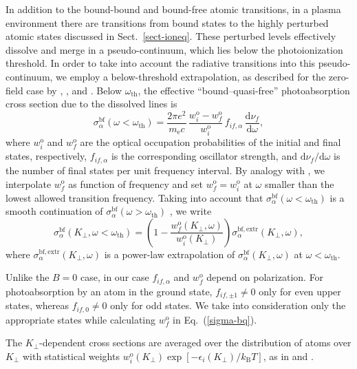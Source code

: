 \documentclass{emulateapj}
\newcommand{\beq}{\begin{equation}}
\newcommand{\eeq}{\end{equation}}
\newcommand{\req}[1]{Eq.\ (\ref{#1})}
\newcommand{\mel}{m_\mathrm{e}}
\newcommand{\dd}{\mathrm{d}}
\newcommand{\kB}{k_\mathrm{B}}
\begin{document}
In addition to the bound-bound and bound-free atomic transitions,
in a plasma environment there are transitions from bound states
to the highly perturbed atomic states 
discussed in Sect.\ \ref{sect-ioneq}.
These perturbed levels effectively dissolve and merge
in a pseudo-continuum, which lies below the photoionization threshold.
In order to take into account the radiative transitions into
this pseudo-continuum, we employ a below-threshold extrapolation, 
as described for the zero-field case
by \citet{dappen87}, \citet{Stehle}, and 
\citet{Seaton}. Below 
$\omega_\mathrm{th}$, 
the effective ``bound--quasi-free''
photoabsorption cross section
due to the dissolved lines is
\beq
   \sigma_\alpha^\mathrm{bf} (\omega < \omega_\mathrm{th})
    = \frac{2\pi e^2}{\mel c}\,
   \frac{w_i^\mathrm{o}-w_f^\mathrm{o}}{w_i^\mathrm{o}}\,
   f_{if,\alpha}\,\frac{\dd\nu_f}{\dd\omega},
\eeq
where $w_i^\mathrm{o}$ and $w_f^\mathrm{o}$ are the optical occupation 
probabilities of the initial and final states, respectively,
$f_{if,\alpha}$ is the corresponding oscillator strength,
and $\dd\nu_f/\dd\omega$ is the number of final states 
per unit frequency interval. By analogy with 
\citet{Stehle}, we interpolate $w_f^\mathrm{o}$ as function 
of frequency and set $w_f^\mathrm{o}=w_i^\mathrm{o}$
at $\omega$ smaller than the lowest allowed transition frequency.
Taking into account that $\sigma_\alpha^\mathrm{bf}(\omega<\omega_\mathrm{th})$
is a smooth continuation of $\sigma_\alpha^\mathrm{bf}(\omega>\omega_\mathrm{th})$
\citep{dappen87},
we write
\beq
    \sigma_\alpha^\mathrm{bf}(K_\perp,\omega<\omega_\mathrm{th}) = \left(
     1- \frac{w_f^\mathrm{o}(K_\perp,\omega)}{w_i^\mathrm{o}(K_\perp)} 
     \right)
    \sigma_\alpha^\mathrm{bf,extr}(K_\perp,\omega),
\label{sigma-bq}
\eeq
where $\sigma_\alpha^\mathrm{bf,extr}(K_\perp,\omega)$
is a power-law extrapolation of 
$\sigma_\alpha^\mathrm{bf}(K_\perp,\omega)$
at $\omega<\omega_\mathrm{th}$.

Unlike the $B=0$ case, in our case $f_{if,\alpha}$
and $w_f^\mathrm{o}$ depend on polarization. 
For photoabsorption by an atom in the ground state,
$f_{if,\pm1}\neq0$ only for even upper states,
whereas $f_{if,0}\neq0$ only for odd states. 
We take into consideration 
only the appropriate states while calculating $w_f^\mathrm{o}$
in \req{sigma-bq}.

The $K_\perp$-dependent cross sections are averaged over the 
distribution of atoms over $K_\perp$
with statistical weights 
$w_i^\mathrm{o}(K_\perp)\exp[-\epsilon_i(K_\perp)/\kB T]$,
as in \citet{PP95}
and \citet{PP97}.
\end{document}
